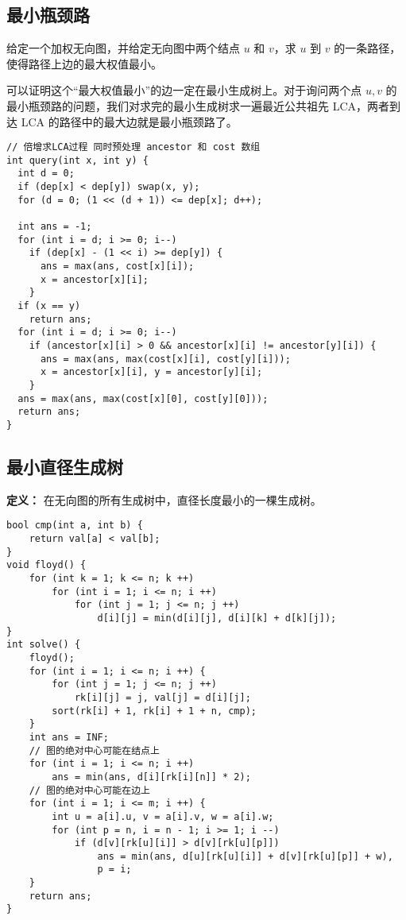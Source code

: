 \subsection{最小瓶颈路}
\par \noindent 给定一个加权无向图，并给定无向图中两个结点 $u$ 和 $v$，求 $u$ 到 $v$ 的一条路径，使得路径上边的最大权值最小。
~\\
\par \noindent 可以证明这个“最大权值最小”的边一定在最小生成树上。对于询问两个点 $u, v$ 的最小瓶颈路的问题，我们对求完的最小生成树求一遍最近公共祖先 LCA，两者到达 LCA 的路径中的最大边就是最小瓶颈路了。
\begin{verbatim}
// 倍增求LCA过程 同时预处理 ancestor 和 cost 数组
int query(int x, int y) {
  int d = 0;
  if (dep[x] < dep[y]) swap(x, y);
  for (d = 0; (1 << (d + 1)) <= dep[x]; d++);
  
  int ans = -1;
  for (int i = d; i >= 0; i--)
    if (dep[x] - (1 << i) >= dep[y]) {
      ans = max(ans, cost[x][i]);
      x = ancestor[x][i];
    }
  if (x == y)
    return ans;
  for (int i = d; i >= 0; i--)
    if (ancestor[x][i] > 0 && ancestor[x][i] != ancestor[y][i]) {
      ans = max(ans, max(cost[x][i], cost[y][i]));
      x = ancestor[x][i], y = ancestor[y][i];
    }
  ans = max(ans, max(cost[x][0], cost[y][0]));
  return ans;
}
\end{verbatim}
\subsection{最小直径生成树}
\textbf{定义：} 在无向图的所有生成树中，直径长度最小的一棵生成树。
\begin{verbatim}
bool cmp(int a, int b) {
    return val[a] < val[b];
}
void floyd() {
    for (int k = 1; k <= n; k ++)
        for (int i = 1; i <= n; i ++)
            for (int j = 1; j <= n; j ++)
                d[i][j] = min(d[i][j], d[i][k] + d[k][j]);
}
int solve() {
    floyd();
    for (int i = 1; i <= n; i ++) {
        for (int j = 1; j <= n; j ++) 
            rk[i][j] = j, val[j] = d[i][j];
        sort(rk[i] + 1, rk[i] + 1 + n, cmp);
    }
    int ans = INF;
    // 图的绝对中心可能在结点上
    for (int i = 1; i <= n; i ++)
        ans = min(ans, d[i][rk[i][n]] * 2);
    // 图的绝对中心可能在边上
    for (int i = 1; i <= m; i ++) {
        int u = a[i].u, v = a[i].v, w = a[i].w;
        for (int p = n, i = n - 1; i >= 1; i --)
            if (d[v][rk[u][i]] > d[v][rk[u][p]])
                ans = min(ans, d[u][rk[u][i]] + d[v][rk[u][p]] + w),
                p = i;
    }
    return ans;
}
\end{verbatim}
